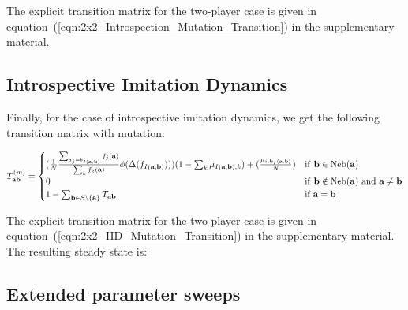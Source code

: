 \documentclass{article}
\begin{document}
The explicit transition matrix for the two-player case is given in
equation~(\ref{eqn:2x2_Introspection_Mutation_Transition}) in the supplementary
material.

\subsection{Introspective Imitation Dynamics}
Finally, for the case of introspective imitation dynamics, we get the following
transition matrix with mutation:

\begin{equation}
T^{(m)}_{\textbf{ab}} =  \begin{cases}
    (\frac{1}{N}\frac{\sum_{a_{j} = b_{I(\textbf{a}, \textbf{b})}}f_j(\textbf{a})}{\sum_{k}f_k(\textbf{a})}\phi(\Delta(f_{I(\textbf{a}, \textbf{b})})))(1-\sum_{k}\mu_{I(\textbf{a}, \textbf{b}),k}) + (\frac{\mu_{i,\textbf{b}_I(\textbf{a}, \textbf{b})}}{N}) & \text{if \textbf{b}}\in \text{Neb(\textbf{a})}\\
    0 & \text{if \textbf{b}}\notin \text{Neb(\textbf{a}) and \textbf{a}} \neq \textbf{b}\\
    1 - \sum_{\textbf{b} \in S \setminus \text{\{\textbf{a}\}}}T_{\textbf{ab}} & \text{if }\textbf{a}=\textbf{b}
\end{cases}
\end{equation}

The explicit transition matrix for the two-player case is given in
equation~(\ref{eqn:2x2_IID_Mutation_Transition}) in the supplementary
material. The resulting steady state is:

\subsection{Extended parameter sweeps}
\end{document}
